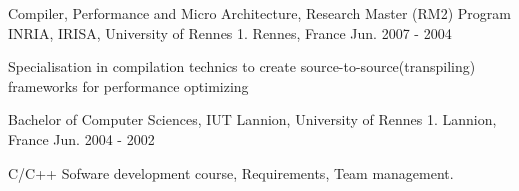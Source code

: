 

\begin{cventries}

  \cventry
    {Compiler, Performance and Micro Architecture, Research Master (RM2) Program} %
    {INRIA, IRISA, University of Rennes 1. } %
    {Rennes, France} %
    {Jun. 2007 - 2004} %
    {
      \begin{cvitems} %
        \item {Specialisation in compilation technics to create source-to-source(transpiling) frameworks for performance optimizing  }
      \end{cvitems}
    }
\cventry
{Bachelor of Computer Sciences, } %
{IUT Lannion, University of Rennes 1. } %
{Lannion, France} %
{Jun. 2004 - 2002} %
{
	\begin{cvitems} %
			\item { C/C++ Sofware development course, Requirements, Team management. }
	\end{cvitems}
}

\end{cventries}
